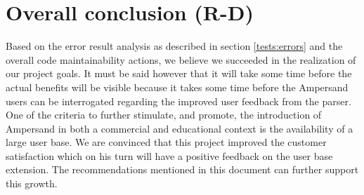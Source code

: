 
\section{Overall conclusion (R-D)}
\label{sec:conclusion}
Based on the error result analysis as described in section \autoref{tests:errors} and the overall code maintainability actions, we believe we succeeded in the realization of our project goals.
It must be said however that it will take some time before the actual benefits will be visible because it takes some time before the Ampersand users can be interrogated regarding the improved user feedback from the parser.
One of the criteria to further stimulate, and promote, the introduction of Ampersand in both a  commercial and educational context is the availability of a large user base.
We are convinced that this project improved the customer satisfaction which on his turn will have a positive feedback on the user base extension.
The recommendations mentioned in this document can further support this growth.

